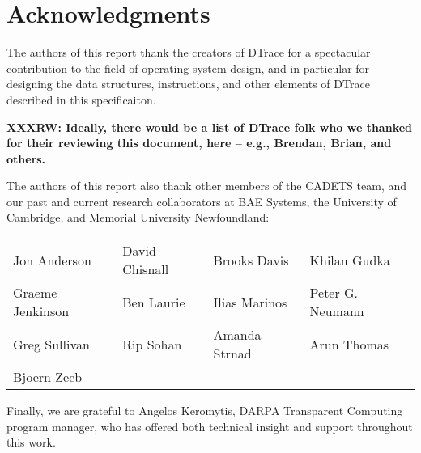 \section*{Acknowledgments}
The authors of this report thank the creators of DTrace for a spectacular
contribution to the field of operating-system design, and in particular for
designing the data structures, instructions, and other elements of DTrace
described in this specificaiton.

\bigskip

\noindent
\textbf{XXXRW: Ideally, there would be a list of DTrace folk who we thanked
for their reviewing this document, here -- e.g., Brendan, Brian, and others.}

\bigskip

The authors of this report also thank other members of the CADETS team, and
our past and current research collaborators at BAE Systems, the University of
Cambridge, and Memorial University Newfoundland:

\bigskip

%
%
\begin{tabular}{llll}
Jon Anderson & David Chisnall & Brooks Davis & Khilan Gudka \\
Graeme Jenkinson & Ben Laurie & Ilias Marinos & Peter G. Neumann \\
Greg Sullivan & Rip Sohan & Amanda Strnad & Arun Thomas \\
Bjoern Zeeb
\end{tabular}

\bigskip

%
%
%

\noindent
Finally, we are grateful to Angelos Keromytis, DARPA Transparent Computing
program manager, who has offered both technical insight and support throughout
this work.
